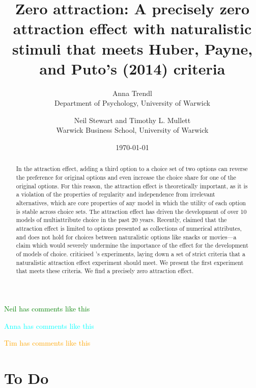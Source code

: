 \documentclass[12pt, a4paper]{article}
\title{}
\author{}
\date{}
\title{Zero attraction: A precisely zero attraction effect with naturalistic stimuli that meets Huber, Payne, and Puto's (2014) criteria}
\author{Anna Trendl\\Department of Psychology, University of Warwick \and Neil Stewart and Timothy L. Mullett\\Warwick Business School, University of Warwick}
\date{\today}
\newcommand{\NS}[1] {{\textcolor{green}{#1}}}
\newcommand{\AT}[1] {{\textcolor{cyan}{#1}}}
\newcommand{\TM}[1] {{\textcolor{orange}{#1}}}
\begin{document}
\begin{titlepage}
\maketitle

\newpage

\begin{abstract}
In the attraction effect, adding a third option to a choice set of two options can reverse the preference for original options and even increase the choice share for one of the original options. For this reason, the attraction effect is theoretically important, as it is a violation of the properties of regularity and independence from irrelevant alternatives, which are core properties of any model in which the utility of each option is stable across choice sets. The attraction effect has driven the development of over 10 models of multiattribute choice in the past 20 years. Recently,  claimed that the attraction effect is limited to options presented as collections of numerical attributes, and does not hold for choices between naturalistic options like snacks or movies---a claim which would severely undermine the importance of the effect for the development of models of choice.  criticised \citeauthor{Frederick2014}'s experiments, laying down a set of strict criteria that a naturalistic attraction effect experiment should meet. We present the first experiment that meets these criteria. We find a precisely zero attraction effect.
\end{abstract}
\end{titlepage}

\NS{Neil has comments like this}

\AT{Anna has comments like this}

\TM{Tim has comments like this}


\section{To Do}
\end{document}
